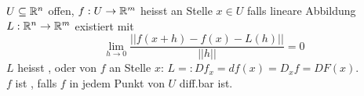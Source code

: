 \Def $U \subseteq \mathbb{R}^n$ offen, $f: U \to \mathbb{R}^m$ heisst an Stelle $x \in U$ 
falls lineare Abbildung $L: \mathbb{R}^n \to \mathbb{R}^m$ existiert mit 
$$\lim_{h \to 0} \frac{||f(x+h) - f(x) - L(h)||}{||h||} = 0$$
$L$ heisst ,  oder  von $f$ an Stelle $x$:
$L =: Df_x = df(x) = D_xf = DF(x)$. \\
$f$ ist , falls $f$ in jedem Punkt von $U$ diff.bar ist.